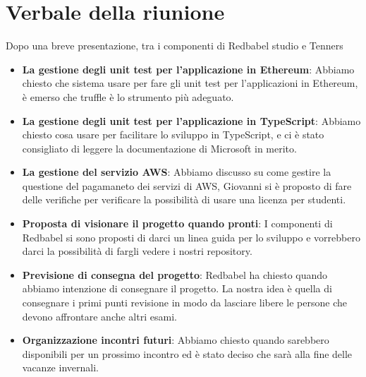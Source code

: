 \section{Verbale della riunione}
		Dopo una breve presentazione, tra i componenti di Redbabel studio e Tenners
	\begin{itemize}
		\item \textbf {La gestione degli unit test per l'applicazione in Ethereum}: Abbiamo chiesto che sistema usare per fare gli unit test per l'applicazioni in Ethereum, è emerso che truffle è lo strumento più adeguato.
		\item \textbf {La gestione degli unit test per l'applicazione in TypeScript}: Abbiamo chiesto cosa usare per facilitare lo sviluppo in TypeScript, e ci è stato consigliato di leggere la documentazione di Microsoft in merito.
		\item \textbf {La gestione del servizio AWS}: Abbiamo discusso su come gestire la questione del pagamaneto dei servizi di AWS, Giovanni si è proposto di fare delle verifiche per verificare la possibilità di usare una licenza per studenti.
		\item \textbf {Proposta di visionare il progetto quando pronti}: I componenti di Redbabel si sono proposti di darci un linea guida per lo sviluppo e vorrebbero darci la possibilità di fargli vedere i nostri repository.
		\item \textbf {Previsione di consegna del progetto}: Redbabel ha chiesto quando abbiamo intenzione di consegnare il progetto. La nostra idea è quella di consegnare i primi punti revisione in modo da lasciare libere le persone che devono affrontare anche altri esami.
		\item \textbf {Organizzazione incontri futuri}: Abbiamo chiesto quando sarebbero disponibili per un prossimo incontro ed è stato deciso che sarà alla fine delle vacanze invernali.
	\end{itemize}
